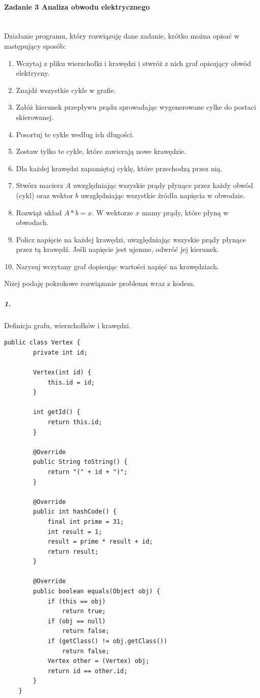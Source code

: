 \documentclass[12pt,a4paper]{article}
\begin{document}
\paragraph{Zadanie 3 Analiza obwodu elektrycznego}\mbox{}\vspace{3mm}\\
Działanie programu, który rozwiązuję dane zadanie, krótko można opisać w
następujący sposób:
\begin{enumerate}
    \item Wczytaj z pliku wierzchołki i krawędzi i stwróż z nich graf opisujący
    obwód elektrycny.
    \item Znajdź wszystkie cykle w grafie.
    \item Załóż kierunek przepływu prądu sprowadając wygenerowane cylke do
    postaci skierowanej.
    \item Posortuj te cykle według ich długości.
    \item Zostaw tylko te cykle, które zawierają nowe krawędzie.
    \item Dla każdej krawędzi zapamiętaj cyklę, które przechodzą przez nią.
    \item Stwórz macierz $A$ uwzględniając wszyskie prądy płynące przez każdy
    obwód (cykl) oraz wektor $b$ uwzględniając wszystkie źródła napięcia w obwodzie.
    \item Rozwiąż układ $A*b = x$. W wektorze $x$ mamy prądy, które płyną w obwodach.
    \item Policz napięcie na każdej krawędzi, uwzględniając wszyskie prądy
    płynące przez tą krawędź. Jeśli napięcie jest ujemne, odwróć jej kierunek.
    \item Narysuj wczytany graf dopisując wartości napięć na krawędziach.
\end{enumerate}
Niżej podaję pokrokowe rozwiązanie problemu wraz z kodem.
\subparagraph{1.} Definicja grafu, wierzchołków i krawędzi.
\begin{Verbatim}[fontsize=\small]
    public class Vertex {
    	private int id;

    	Vertex(int id) {
    	    this.id = id;
        }

    	int getId() {
    	    return this.id;
        }

    	@Override
    	public String toString() {
    		return "(" + id + ")";
    	}

    	@Override
    	public int hashCode() {
    		final int prime = 31;
    		int result = 1;
    		result = prime * result + id;
    		return result;
    	}

    	@Override
    	public boolean equals(Object obj) {
    		if (this == obj)
    			return true;
    		if (obj == null)
    			return false;
    		if (getClass() != obj.getClass())
    			return false;
    		Vertex other = (Vertex) obj;
    		return id == other.id;
    	}
    }
\end{Verbatim}
\end{document}
